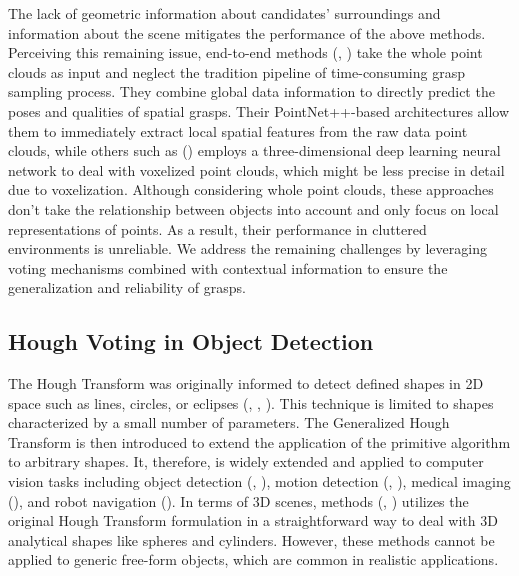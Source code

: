 The lack of geometric information about candidates’ surroundings and information about the scene mitigates the performance of the above methods. Perceiving this remaining issue, end-to-end methods (\textcolor{cyan}{\cite{fang2020graspnet}}, \textcolor{cyan}{\cite{ni2020pointnet++}}) take the whole point clouds as input and neglect the tradition pipeline of time-consuming grasp sampling process. They combine global data information to directly predict the poses and qualities of spatial grasps. Their PointNet++-based architectures allow them to immediately extract local spatial features from the raw data point clouds, while others such as (\textcolor{cyan}{\cite{choi2018learning}}) employs a three-dimensional deep learning neural network to deal with voxelized point clouds, which might be less precise in detail due to voxelization. Although considering whole point clouds, these approaches don’t take the relationship between objects into account and only focus on local representations of points. As a result, their performance in cluttered environments is unreliable. We address the remaining challenges by leveraging voting mechanisms combined with contextual information to ensure the generalization and reliability of grasps.

\subsection{Hough Voting in Object Detection}
The Hough Transform was originally informed to detect defined shapes in 2D space such as lines, circles, or eclipses (\textcolor{cyan}{\cite{hough1959machine}}, \textcolor{cyan}{\cite{hough1962method}}, \textcolor{cyan}{\cite{duda1972textordfeminineuse}}). This technique is limited to shapes characterized by a small number of parameters. The Generalized Hough Transform is then introduced to extend the application of the primitive algorithm to arbitrary shapes. It, therefore, is widely extended and applied to computer vision tasks including object detection (\textcolor{cyan}{\cite{gall2013class}}, \textcolor{cyan}{\cite{gall2011hough}}), motion detection (\textcolor{cyan}{\cite{gall2011hough}}, \textcolor{cyan}{\cite{kalviainen1996motion}}), medical imaging (\textcolor{cyan}{\cite{golemati2006comparison}}), and robot navigation (\textcolor{cyan}{\cite{iocchi2001probabilistic}}). In terms of 3D scenes, methods (\textcolor{cyan}{\cite{deng2018ppfnet}}, \textcolor{cyan}{\cite{rabbani2005efficient}}) utilizes the original Hough Transform formulation in a straightforward way to deal with 3D analytical shapes like spheres and cylinders. However, these methods cannot be applied to generic free-form objects, which are common in realistic applications.


